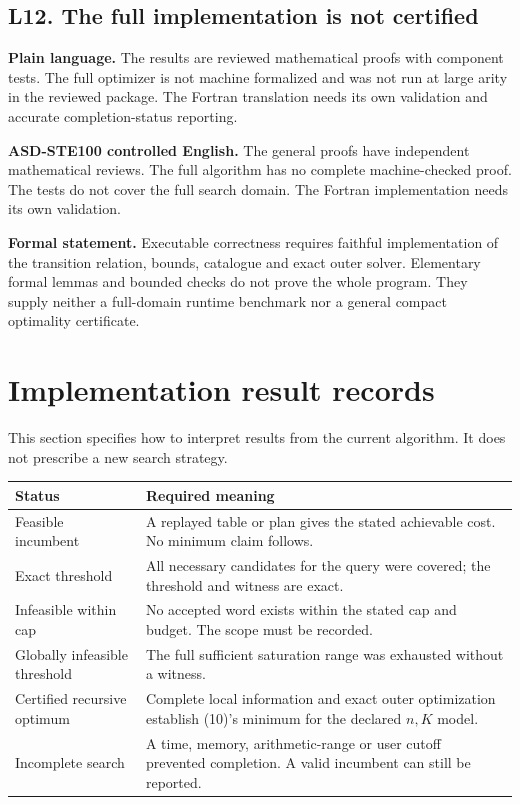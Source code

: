 \documentclass[11pt,letterpaper]{article}
\newcommand{\Plain}[1]{\par\textbf{\color{navy}Plain language.} #1\par}
\newcommand{\STE}[1]{\par\textbf{\color{teal}ASD-STE100 controlled English.} #1\par}
\newcommand{\Formal}[1]{\par\textbf{Formal statement.} #1\par}
\begin{document}
\subsection{L12. The full implementation is not certified}
\Plain{The results are reviewed mathematical proofs with component
tests. The full optimizer is not machine formalized and was not
run at large arity in the reviewed package. The Fortran translation
needs its own validation and accurate completion-status reporting.}
\STE{The general proofs have independent mathematical reviews. The full algorithm has no complete machine-checked proof. The tests do not cover the full search domain. The Fortran implementation needs its own validation.}
\Formal{Executable correctness requires faithful implementation of
the transition relation, bounds, catalogue and exact outer solver.
Elementary formal lemmas and bounded checks do not prove the whole
program. They supply neither a full-domain runtime benchmark nor
a general compact optimality certificate.}

\clearpage
\section{Implementation result records}\label{sec:records}
This section specifies how to interpret results from the current
algorithm. It does not prescribe a new search strategy.
\begin{longtable}{@{}>{\raggedright\arraybackslash}p{}>{\raggedright\arraybackslash}p{}@{}}
\toprule Status & Required meaning\\ \midrule
Feasible incumbent&A replayed table or plan gives the stated achievable cost. No minimum claim follows.\\
Exact threshold&All necessary candidates for the query were covered; the threshold and witness are exact.\\
Infeasible within cap&No accepted word exists within the stated cap and budget. The scope must be recorded.\\
Globally infeasible threshold&The full sufficient saturation range was exhausted without a witness.\\
Certified recursive optimum&Complete local information and exact outer optimization establish (10)'s minimum for the declared \(n,K\) model.\\
Incomplete search&A time, memory, arithmetic-range or user cutoff prevented completion. A valid incumbent can still be reported.\\
\bottomrule
\end{longtable}
\end{document}
